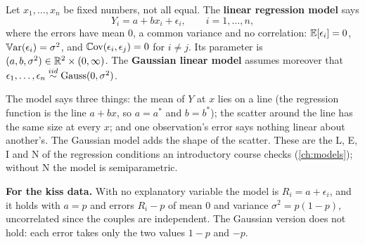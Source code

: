 \begin{definition}
\label{def:linmodel}
Let $x_1, \ldots, x_n$ be fixed numbers, not all equal.
The \textbf{linear regression model} says
\[
Y_i = a + bx_i + \epsilon_i, \qquad i = 1, \ldots, n,
\]
where the errors have mean $0$, a common variance and no correlation: $\operatorname*{\mathbb{E}}[\epsilon_i] = 0$, $\operatorname*{\mathbb{V}\text{ar}}(\epsilon_i) = \sigma^2$, and $\operatorname*{\mathbb{C}\text{ov}}(\epsilon_i, \epsilon_j) = 0$ for $i \neq j$.
Its parameter is $(a, b, \sigma^2) \in \mathbb{R}^2 \times (0, \infty)$.
The \textbf{Gaussian linear model} assumes moreover that $\epsilon_1, \ldots, \epsilon_n \stackrel{iid}{\sim} \text{Gauss}(0, \sigma^2)$.
\end{definition}

\begin{inwords}
The model says three things: the mean of $Y$ at $x$ lies on a line (the regression function is the line $a + bx$, so $a = a^*$ and $b = b^*$); the scatter around the line has the same size at every $x$; and one observation's error says nothing linear about another's. The Gaussian model adds the shape of the scatter. These are the L, E, I and N of the regression conditions an introductory course checks (\cref{ch:models}); without N the model is semiparametric.

\textbf{For the kiss data.} With no explanatory variable the model is $R_i = a + \epsilon_i$, and it holds with $a = p$ and errors $R_i - p$ of mean $0$ and variance $\sigma^2 = p(1 - p)$, uncorrelated since the couples are independent. The Gaussian version does not hold: each error takes only the two values $1 - p$ and $-p$.
\end{inwords}

